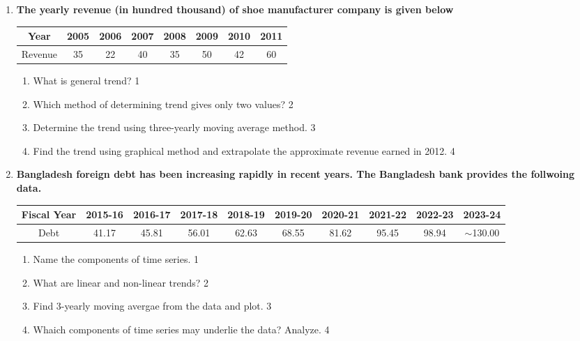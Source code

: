\documentclass[a4paper,oneside]{book}
\begin{document}
  \begin{enumerate}

   \item
	  \textbf{The yearly revenue (in hundred thousand) of shoe manufacturer company is given below} 
  \begin{table}[h]
\centering
\begin{tabular}{cccccccc}
Year     & 2005 & 2006 & 2007 & 2008 & 2009 & 2010 & 2011 \\ \hline
Revenue & 35   & 22    & 40     & 35     & 50     & 42 & 60   
\end{tabular}
\end{table}
  
  \begin{enumerate}
    \item
	What is general trend? \hfill 1
    \item
	Which method of determining trend gives only two values? \hfill 2
    \item  
	Determine the trend using three-yearly moving average method. \hfill 3
    \item
	Find the trend using graphical method and extrapolate the approximate revenue earned in 2012. \hfill 4
  \end{enumerate}
  
     \item
	  \textbf{Bangladesh foreign debt has been increasing rapidly in recent years. The Bangladesh bank provides the follwoing data.}
	  
	  \begin{table}[h]
	  \centering
\begin{tabular}{c|c|c|c|c|c|c|c|c|c}
Fiscal Year & 2015-16 & 2016-17 & 2017-18 & 2018-19 & 2019-20 & 2020-21 & 2021-22 & 2022-23 & 2023-24 \\ \hline
Debt & 41.17 & 45.81 & 56.01 & 62.63 & 68.55 & 81.62 & 95.45 & 98.94 & $\sim$130.00
\end{tabular}
\end{table}
  
  \begin{enumerate}
    \item
	Name the components of time series. \hfill 1
    \item
	What are linear and non-linear trends? \hfill 2
    \item  
	Find 3-yearly moving avergae from the data and plot. \hfill 3
    \item
	Whaich components of time series may underlie the data? Analyze. \hfill 4
  \end{enumerate}


\end{enumerate}
\end{document}
